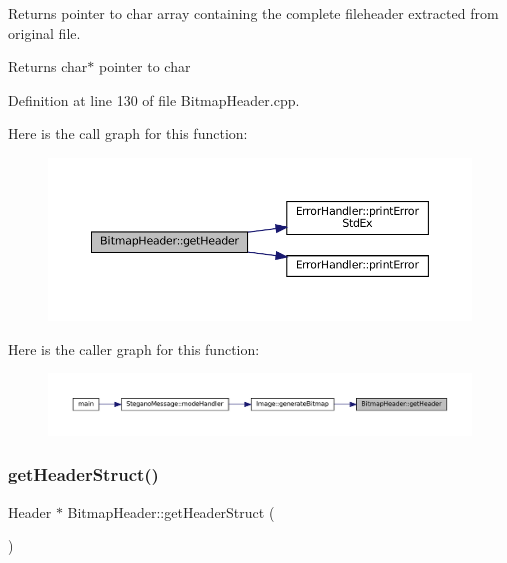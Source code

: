 Returns pointer to char array containing the complete fileheader extracted from original file. 

\begin{DoxyReturn}{Returns}
char$\ast$ pointer to char 
\end{DoxyReturn}


Definition at line 130 of file Bitmap\+Header.\+cpp.

Here is the call graph for this function\+:\nopagebreak
\begin{figure}[H]
\begin{center}
\leavevmode
\includegraphics[width=350pt]{classBitmapHeader_aa29e1acc8a7a588867039d7c0bdcde04_cgraph}
\end{center}
\end{figure}
Here is the caller graph for this function\+:\nopagebreak
\begin{figure}[H]
\begin{center}
\leavevmode
\includegraphics[width=350pt]{classBitmapHeader_aa29e1acc8a7a588867039d7c0bdcde04_icgraph}
\end{center}
\end{figure}
\mbox{\label{classBitmapHeader_a7ac69b70fce7b54c9cd3134a0e68ea58}} 
\subsubsection{\texorpdfstring{getHeaderStruct()}{getHeaderStruct()}}
{\footnotesize\ttfamily Header $\ast$ Bitmap\+Header\+::get\+Header\+Struct (\begin{DoxyParamCaption}{ }\end{DoxyParamCaption})}



